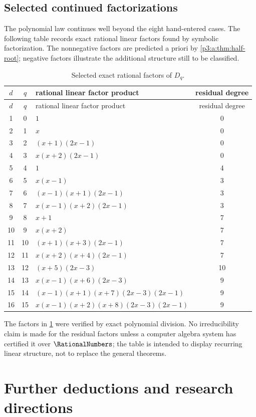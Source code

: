 \documentclass[11pt,oneside]{article}
\numberwithin{equation}{section}
\theoremstyle{definition}
\theoremstyle{remark}
\begin{document}
\subsection{Selected continued factorizations}

The polynomial law continues well beyond the eight hand-entered cases.  The
following table records exact rational linear factors found by symbolic
factorization.  The nonnegative factors are predicted a priori by
\cref{p3:a:thm:half-root}; negative factors illustrate the additional
structure still to be classified.

\begin{longtable}{c c p{} c}
\caption{Selected exact rational factors of \(D_q\).\label{p3:c:tab:factorizations}}\\
\toprule
\(d\)&\(q\)&rational linear factor product&residual degree\\
\midrule
\endfirsthead
\toprule
\(d\)&\(q\)&rational linear factor product&residual degree\\
\midrule
\endhead
1&0&\(1\)&0\\
2&1&\(x\)&0\\
3&2&\((x+1)(2x-1)\)&0\\
4&3&\(x(x+2)(2x-1)\)&0\\
5&4&\(1\)&4\\
6&5&\(x(x-1)\)&3\\
7&6&\((x-1)(x+1)(2x-1)\)&3\\
8&7&\(x(x-1)(x+2)(2x-1)\)&3\\
9&8&\(x+1\)&7\\
10&9&\(x(x+2)\)&7\\
11&10&\((x+1)(x+3)(2x-1)\)&7\\
12&11&\(x(x+2)(x+4)(2x-1)\)&7\\
13&12&\((x+5)(2x-3)\)&10\\
14&13&\(x(x-1)(x+6)(2x-3)\)&9\\
15&14&\((x-1)(x+1)(x+7)(2x-3)(2x-1)\)&9\\
16&15&\(x(x-1)(x+2)(x+8)(2x-3)(2x-1)\)&9\\
\bottomrule
\end{longtable}

The factors in \cref{p3:c:tab:factorizations} were verified by exact polynomial
division.  No irreducibility claim is made for the residual factors unless a
computer algebra system has certified it over \(\RationalNumbers\); the table is intended
to display recurring linear structure, not to replace the general theorems.
\section{Further deductions and research directions}\label{p3:ch:future}
\end{document}
